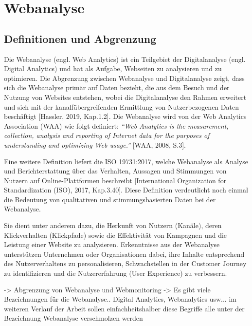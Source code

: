 \chapter{Webanalyse} %
\label{ch:webanalyse} 

\section{Definitionen und Abgrenzung} %
Die Webanalyse (engl. Web Analytics) ist ein Teilgebiet der Digitalanalyse (engl. Digital Analytics) und hat als Aufgabe, Webseiten zu analysieren und zu optimieren. Die Abgrenzung zwischen Webanalyse und Digitalanalyse zeigt, dass sich die Webanalyse primär auf Daten bezieht, die aus dem Besuch und der Nutzung von Websites entstehen, wobei die Digitalanalyse den Rahmen erweitert und sich mit der kanalfübergreifenden Ermittlung von Nutzerbezogenen Daten beschäftigt [Hassler, 2019, Kap.1.2]. Die Webanalyse wird von der Web Analytics Association (WAA) wie folgt definiert: \textit{``Web Analytics is the measurement, collection, analysis and reporting of Internet data for the purposes of understanding and optimizing Web usage.''} [WAA, 2008, S.3].

Eine weitere Definition liefert die ISO 19731:2017, welche Webanalyse als Analyse und Berichterstattung über das Verhalten, Aussagen und Stimmungen von Nutzern auf Online-Plattformen beschreibt [International Organization for Standardization (ISO), 2017, Kap.3.40]. Diese Definition verdeutlicht noch einmal die Bedeutung von qualitativen und stimmungsbasierten Daten bei der Webanalyse. 

Sie dient unter anderem dazu, die Herkunft von Nutzern (Kanäle), deren Klickverhalten (Klickpfade) sowie die Effektivität von Kampagnen und die Leistung einer Website zu analysieren. Erkenntnisse aus der Webanalyse unterstützen Unternehmen oder Organisationen dabei, ihre Inhalte entsprechend des Nutzerverhaltens zu personalisieren, Schwachstellen in der Customer Journey zu identifizieren und die Nutzererfahrung (User Experience) zu verbessern.

-> Abgrenzung von Webanalyse und Webmonitoring
-> Es gibt viele Bezeichnungen für die Webanalyse.. Digital Analytics, Webanalytics usw... im weiteren Verlauf der Arbeit sollen einfachheitshalber diese Begriffe alle unter der Bezeichnung Webanalyse verschmolzen werden 

